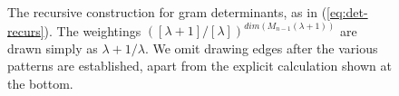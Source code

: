 \documentclass{article}
\theoremstyle{definition}
\newcommand{\ignore}[1]{}
\numberwithin{equation}{subsection}
\begin{document}
\begin{figure}

  \caption{The recursive construction for gram determinants, as in (\ref{eq:det-recurs}).
    The weightings
    $ ( [\lambda\!+\!1]/[\lambda] )^{dim(M_{n-1}(\lambda+1))} $
    are drawn simply as
    $\lambda\!+\!1/\lambda$. 
    We omit drawing edges after the various patterns are established,
    apart from the explicit calculation shown at the bottom. 
    \label{fig:gramdets031}}
\end{figure}

\ignore{\begin{figure}
  
%
\newcommand{\sqrr}{\square\ar[r]}
\newcommand{\goll}{\ar@/_1.3pc/[ll]} 
\newcommand{\gollll}{\ar@/_1.4pc/[llll]} 
\newcommand{\gollllll}{\ar@/_1.5pc/[llllll]} 
\newcommand{\gollllllll}{\ar@/_1.7pc/[llllllll]} 
%
%
\[ { } \hspace{-.253in}
%
\xymatrix @C=15pt @R=1pt {
  {\lambda=0  }       &  1             &  2      &  3  &  4  &  5   & 6 & 7 & 8 
  \\  %
    {\du{1}{1} }\ar[dr]
    \\
& {\du{1}{1}}\ar[dr]\ar[dl]^{2/1}
\\ 
{\du{1}{{[2]}} }\ar[dr]    &                  &
{\du{1}{1}}\ar[dr]\ar[dl]^{3/2}
\\
&{\du{2}{[3]}} \ar[dr]\ar[dl]^{2/1}               &     &
{\du{1}{1}}\ar[dr]\ar[dl]^{4/3}
\\ 
{ \du{2}{{[ 2]}^2 [3]}}  &                     &
{\du{3}{[4]} }&    &
{\du{1}{1} }
\\
    & {\du{5}{{\frac{ [3]^4 [4]}{[2]}^{}}}} &  &
    {\du{4}{[5]}} &  &
    {\du{1}{1}}\ar@/_1.3pc/[ll]
    \\ 
    {\du{5}{{[2]}^4 [3]^4 [4]}} &              &
    {\du{9}{{\frac{[4]^5[5]}{[2]}^{}}}} &    &
    {\du{5}{[6]}} & &{ \du{1}{1}}\ar@/_1.4pc/[llll]
    \\ 
    &{\du{14}{\frac{[3]^{13}[4]^6[5]}{[2]^{6}}}} &&
    {\du{14}{\frac{[5]^6[6]}{[2]^{}}}} &&
    {\du{6}{[7]}}\ar@/_1.3pc/[ll] &&
}\]
\end{figure}}
\end{document}
